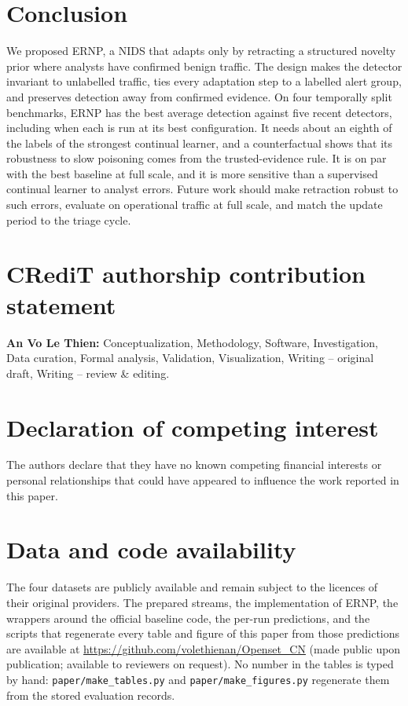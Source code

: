 \documentclass[a4paper,fleqn]{cas-dc}
\newcommand{\ERNP}{ERNP\xspace}
\begin{document}
\section{Conclusion}
\label{sec:conclusion}
We proposed \ERNP, a NIDS that adapts only by retracting a structured novelty prior where analysts have confirmed benign traffic. The design makes the detector invariant to unlabelled traffic, ties every adaptation step to a labelled alert group, and preserves detection away from confirmed evidence. On four temporally split benchmarks, \ERNP has the best average detection against five recent detectors, including when each is run at its best configuration. It needs about an eighth of the labels of the strongest continual learner, and a counterfactual shows that its robustness to slow poisoning comes from the trusted-evidence rule. It is on par with the best baseline at full scale, and it is more sensitive than a supervised continual learner to analyst errors. Future work should make retraction robust to such errors, evaluate on operational traffic at full scale, and match the update period to the triage cycle.

\section*{CRediT authorship contribution statement}
\textbf{An Vo Le Thien:} Conceptualization, Methodology, Software, Investigation, Data curation, Formal analysis, Validation, Visualization, Writing -- original draft, Writing -- review \& editing.

\section*{Declaration of competing interest}
The authors declare that they have no known competing financial interests or personal relationships that could have appeared to influence the work reported in this paper.

\section*{Data and code availability}
The four datasets are publicly available and remain subject to the licences of their original providers. The prepared streams, the implementation of \ERNP, the wrappers around the official baseline code, the per-run predictions, and the scripts that regenerate every table and figure of this paper from those predictions are available at \url{https://github.com/volethienan/Openset_CN} (made public upon publication; available to reviewers on request). No number in the tables is typed by hand: \texttt{paper/make\_tables.py} and \texttt{paper/make\_figures.py} regenerate them from the stored evaluation records.
\end{document}
